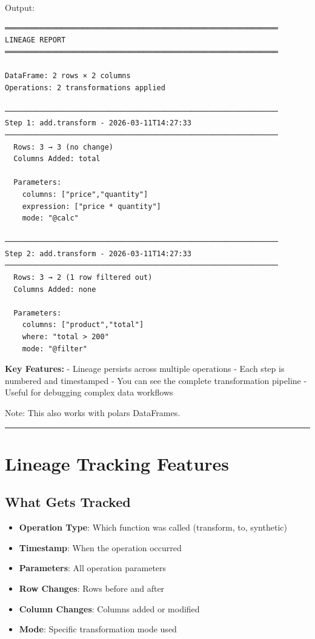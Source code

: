 \documentclass[
  letterpaper,
]{scrbook}
\providecommand{\tightlist}{%
  \setlength{\itemsep}{0pt}\setlength{\parskip}{0pt}}
\begin{document}
Output:

\begin{verbatim}
═══════════════════════════════════════════════════════════════
LINEAGE REPORT
═══════════════════════════════════════════════════════════════

DataFrame: 2 rows × 2 columns
Operations: 2 transformations applied

───────────────────────────────────────────────────────────────
Step 1: add.transform - 2026-03-11T14:27:33
───────────────────────────────────────────────────────────────
  Rows: 3 → 3 (no change)
  Columns Added: total
  
  Parameters:
    columns: ["price","quantity"]
    expression: ["price * quantity"]
    mode: "@calc"

───────────────────────────────────────────────────────────────
Step 2: add.transform - 2026-03-11T14:27:33
───────────────────────────────────────────────────────────────
  Rows: 3 → 2 (1 row filtered out)
  Columns Added: none
  
  Parameters:
    columns: ["product","total"]
    where: "total > 200"
    mode: "@filter"
\end{verbatim}

\textbf{Key Features:} - Lineage persists across multiple operations -
Each step is numbered and timestamped - You can see the complete
transformation pipeline - Useful for debugging complex data workflows

Note: This also works with polars DataFrames.

\begin{center}\rule{0.5\linewidth}{0.5pt}\end{center}

\section{Lineage Tracking Features}\label{lineage-tracking-features-1}

\subsection{What Gets Tracked}\label{what-gets-tracked-1}

\begin{itemize}
\tightlist
\item
  \textbf{Operation Type}: Which function was called (transform, to,
  synthetic)
\item
  \textbf{Timestamp}: When the operation occurred
\item
  \textbf{Parameters}: All operation parameters
\item
  \textbf{Row Changes}: Rows before and after
\item
  \textbf{Column Changes}: Columns added or modified
\item
  \textbf{Mode}: Specific transformation mode used
\end{itemize}
\end{document}
